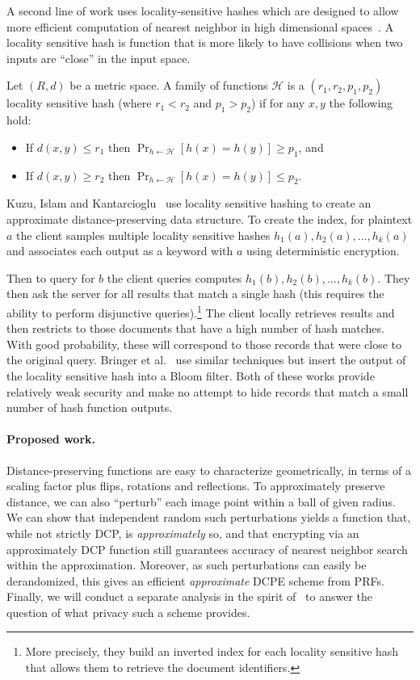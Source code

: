 A second line of work uses locality-sensitive hashes which are designed to allow more efficient computation of nearest neighbor in high dimensional spaces~\cite{datar2004locality,slaney2008locality}.  A locality sensitive hash is function that is more likely to have collisions when two inputs are ``close'' in the input space.  \begin{definition}
  Let $(R,d)$ be a metric space.  A family of functions $\mathcal{H}$ is a $(r_1, r_2, p_1, p_2)$ locality sensitive hash (where $r_1< r_2$ and $p_1 >p_2$) if for any $x, y$ the following hold:
\begin{itemize}\setlength\itemsep{0em}
\item If $d(x, y) \le r_1$ then $\Pr_{h\leftarrow \mathcal{H}}[h(x) = h(y)] \ge p_1$, and 
\item If $d(x, y) \ge r_2$ then $\Pr_{h\leftarrow \mathcal{H}}[h(x) = h(y)] \le p_2$.
\end{itemize}
\end{definition}
 
Kuzu, Islam and Kantarcioglu~\cite{kuzu2012efficient} use locality sensitive hashing to create an approximate distance-preserving data structure.  To create the index, for plaintext $a$ the client samples multiple locality sensitive hashes $h_1(a), h_2(a),...,h_k(a)$ and associates each output as a keyword with $a$ using deterministic encryption.

Then to query for $b$ the client queries computes $h_1(b), h_2(b),...,h_k(b)$. They then ask the server for all results that match a single hash (this requires the ability to perform disjunctive queries).\footnote{More precisely, they build an inverted index for each locality sensitive hash that allows them to retrieve the document identifiers.}  The client locally retrieves results and then restricts to those documents that have a high number of hash matches.  With good probability, these will correspond to those records that were close to the original query.  Bringer et al.~\cite{bringer2011identification,bringer2009error} use similar techniques but insert the output of the locality sensitive hash into a Bloom filter.  Both of these works provide relatively weak security and make no attempt to hide records that match a small number of hash function outputs.  

\paragraph{Proposed work.}
Distance-preserving functions are easy to characterize geometrically, in terms of a scaling factor plus flips, rotations and reflections.  To approximately preserve distance, we can also  ``perturb'' each image point within a ball of given radius.  
We can show that independent random such perturbations yields a function that, while not strictly DCP, is \emph{approximately} so, and that encrypting via an approximately DCP function still guarantees accuracy of nearest neighbor  search within the approximation.  Moreover, as such perturbations can easily be derandomized, this gives an efficient \emph{approximate} DCPE scheme from PRFs.  Finally, we will conduct a separate analysis in the spirit of~\cite{C:BolCheONe11} to answer the question of what privacy such a scheme provides.  

